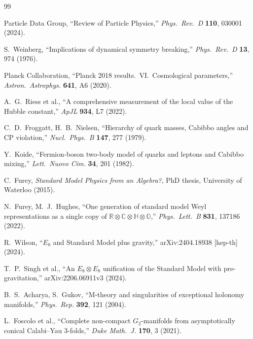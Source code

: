 
\begin{thebibliography}{99}

 Particle Data Group, ``Review of Particle Physics,'' \textit{Phys.\ Rev.\ D} \textbf{110}, 030001 (2024).

 S.~Weinberg, ``Implications of dynamical symmetry breaking,'' \textit{Phys.\ Rev.\ D} \textbf{13}, 974 (1976).

 Planck Collaboration, ``Planck 2018 results.\ VI.\ Cosmological parameters,'' \textit{Astron.\ Astrophys.} \textbf{641}, A6 (2020).

 A.~G.~Riess et al., ``A comprehensive measurement of the local value of the Hubble constant,'' \textit{ApJL} \textbf{934}, L7 (2022).

 C.~D.~Froggatt, H.~B.~Nielsen, ``Hierarchy of quark masses, Cabibbo angles and CP violation,'' \textit{Nucl.\ Phys.\ B} \textbf{147}, 277 (1979).

 Y.~Koide, ``Fermion-boson two-body model of quarks and leptons and Cabibbo mixing,'' \textit{Lett.\ Nuovo Cim.} \textbf{34}, 201 (1982).

 C.~Furey, \textit{Standard Model Physics from an Algebra?}, PhD thesis, University of Waterloo (2015).

 N.~Furey, M.~J.~Hughes, ``One generation of standard model Weyl representations as a single copy of $\mathbb{R} \otimes \mathbb{C} \otimes \mathbb{H} \otimes \mathbb{O}$,'' \textit{Phys.\ Lett.\ B} \textbf{831}, 137186 (2022).

 R.~Wilson, ``$E_8$ and Standard Model plus gravity,'' arXiv:2404.18938 [hep-th] (2024).

 T.~P.~Singh et al., ``An $E_8 \otimes E_8$ unification of the Standard Model with pre-gravitation,'' arXiv:2206.06911v3 (2024).

 B.~S.~Acharya, S.~Gukov, ``M-theory and singularities of exceptional holonomy manifolds,'' \textit{Phys.\ Rep.} \textbf{392}, 121 (2004).

 L.~Foscolo et al., ``Complete non-compact $G_2$-manifolds from asymptotically conical Calabi--Yau 3-folds,'' \textit{Duke Math.\ J.} \textbf{170}, 3 (2021).


\end{thebibliography}
